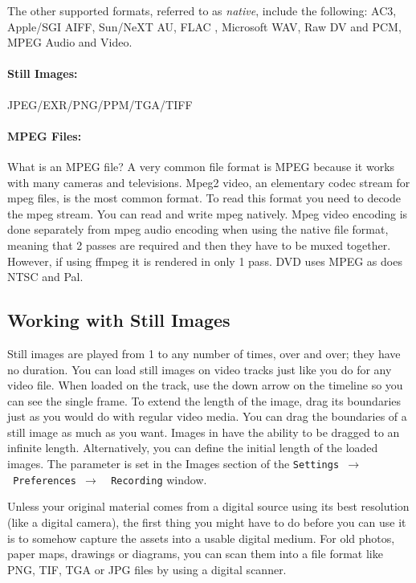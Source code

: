 The other supported formats, referred to as \textit{native},  include the following:
AC3, 
Apple/SGI AIFF,
Sun/NeXT AU,
FLAC ,
Microsoft WAV,
Raw DV and PCM,
MPEG Audio and Video.

\paragraph{Still Images:}  JPEG/EXR/PNG/PPM/TGA/TIFF

\paragraph{MPEG Files:} 
What is an MPEG file?  A very common file format is MPEG because it works with many cameras and televisions.  Mpeg2 video, an elementary codec stream for mpeg files, is the most common format.  To read this format you need to decode the mpeg stream.  You can read and write mpeg natively.  Mpeg video encoding is done separately from mpeg audio encoding when using the native file format, meaning that 2 passes are required and then they have to be muxed together.  However, if using ffmpeg it is rendered in only 1 pass.  DVD uses MPEG as does NTSC and Pal.

\subsection{Working with Still Images}%
\label{sub:working_with_still_images}

Still images are played from 1 to any number of times, over and over; they have no duration. You can load still images on video tracks just like you do for any video file. When loaded on the track, use the down arrow on the timeline so you can see the single frame. To extend the length of the image, drag its boundaries just as you would do with regular video media. You can drag the boundaries of a still image as much as you want. Images in \CGG{} have the ability to be dragged to an infinite length. Alternatively, you can define the initial length of the loaded images. The parameter is set in the Images section of the \texttt{Settings $\rightarrow$ ~Preferences $\rightarrow$ ~Recording} window.

Unless your original material comes from a digital source using its best resolution (like a digital camera), the first thing you might have to do before you can use it is to somehow capture the assets into a usable digital medium. For old photos, paper maps, drawings or diagrams, you can scan them into a file format like PNG, TIF, TGA or JPG files by using a digital scanner.

